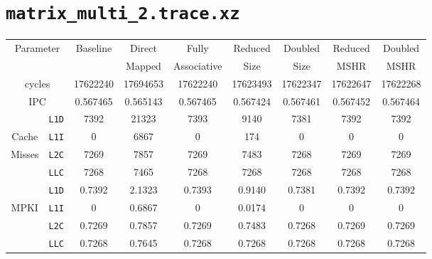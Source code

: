 \documentclass[11pt, swedish, openany]{book}
\begin{document}
\section{\texttt{matrix\_multi\_2.trace.xz}}
\begin{table}[H]
    \begin{tabular}{||c|c||c||c|c||c|c||c|c||}
        \hline
        \multicolumn{2}{||c||}{\multirow{2}{*}{Parameter}} & \multirow{2}{*}{Baseline} & Direct   & Fully       & Reduced  & Doubled  & Reduced  & Doubled  \\
        \multicolumn{2}{||c||}{}                           &                           & Mapped   & Associative & Size     & Size     & MSHR     & MSHR     \\
        \hline
        \multicolumn{2}{||c||}{cycles}                     & 17622240                  & 17694653 & 17622240    & 17623493 & 17622347 & 17622647 & 17622268 \\
        \multicolumn{2}{||c||}{IPC}                        & 0.567465                  & 0.565143 & 0.567465    & 0.567424 & 0.567461 & 0.567452 & 0.567464 \\
        \hline
                                            & \texttt{L1D} & 7392                      & 21323    & 7393        & 9140     & 7381     & 7392     & 7392     \\
        Cache                               & \texttt{L1I} & 0                         & 6867     & 0           & 174      & 0        & 0        & 0        \\
        Misses                              & \texttt{L2C} & 7269                      & 7857     & 7269        & 7483     & 7268     & 7269     & 7269     \\
                                            & \texttt{LLC} & 7268                      & 7465     & 7268        & 7268     & 7268     & 7268     & 7268     \\
        \hline
                                            & \texttt{L1D} & 0.7392                    & 2.1323   & 0.7393      & 0.9140   & 0.7381   & 0.7392   & 0.7392   \\
        \multirow{2}{*}{MPKI}               & \texttt{L1I} & 0                         & 0.6867   & 0           & 0.0174   & 0        & 0        & 0        \\
                                            & \texttt{L2C} & 0.7269                    & 0.7857   & 0.7269      & 0.7483   & 0.7268   & 0.7269   & 0.7269   \\
                                            & \texttt{LLC} & 0.7268                    & 0.7645   & 0.7268      & 0.7268   & 0.7268   & 0.7268   & 0.7268   \\

\end{tabular}
\end{table}
\end{document}
